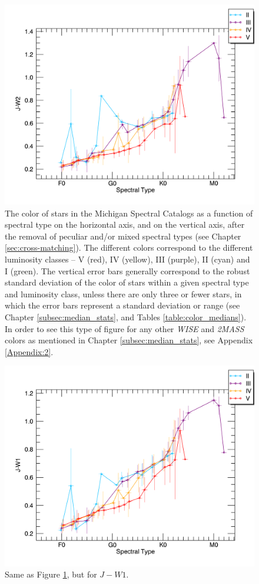 \begin{figure}[t]
\centering
\includegraphics[width=1.0\textwidth,clip=true]{Figures/subtype_bar/SPT_J-W2.png}
\caption{The color of stars in the Michigan Spectral Catalogs as a function of spectral type on the horizontal axis, and \jwtwo on the vertical axis, after the removal of peculiar and/or mixed spectral types (see Chapter \ref{sec:cross-matching}). The different colors correspond to the different luminosity classes -- V (red), IV (yellow), III (purple), II (cyan) and I (green).  The vertical error bars generally correspond to the robust standard deviation of the \jwtwo color of stars within a given spectral type and luminosity class, unless there are only three or fewer stars, in which the error bars represent a standard deviation or range (see Chapter \ref{subsec:median_stats}, and Tables \ref{table:color_medians}). In order to see this type of figure for any other \textit{WISE} and \textit{2MASS} colors as mentioned in Chapter \ref{subsec:median_stats}, see Appendix \ref{Appendix:2}.} \label{fig:median_stick_bar_jw2}
\end{figure}

\begin{figure}[t]
\centering
\includegraphics[width=1.0\textwidth,clip=true]{Figures/subtype_bar/SPT_J-W1.png}
\caption{Same as Figure \ref{fig:median_stick_bar_jw2}, but for $J-W{1}$.} \label{fig:median_stick_bar_jw1}
\end{figure}